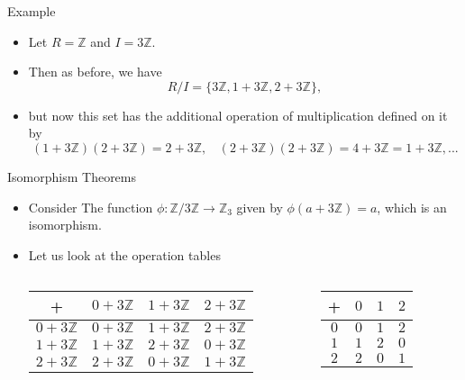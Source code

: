 \documentclass[ %
 10pt, xcolor={dvipsnames,svgnames,x11names,hyperref},
   hyperref={colorlinks=true,citecolor=green,linkcolor=DarkRed,urlcolor=ProcessBlue,anchorcolor=blue}
  ]{beamer}
\newenvironment{stepitemize}{\begin{itemize}[<+->]}{\end{itemize} }
\newcommand{\Z}{\mathbb{Z}}
\begin{document}
\begin{frame}{Example}
\begin{stepitemize}
    \item Let $R=\Z$ and $I=3\Z$.
    \item Then as before, we have
    $$R/I = \{3\Z, 1+3\Z, 2+3\Z\},$$
\item but now this set has the additional operation of multiplication defined on it by
    $$(1+3\Z)(2+3\Z)=2+3\Z, \:\:\:\: (2+3\Z)(2+3\Z) = 4+3\Z=1+3\Z, ...$$
\end{stepitemize}
\end{frame}

\begin{frame}{Isomorphism Theorems}
\begin{stepitemize}
    \item Consider The function $\phi:\Z/3\Z\rightarrow \Z_3$ given by $\phi(a+3\Z)=a$, which is an isomorphism.
    \item Let us look at the operation tables

\begin{columns}
        \begin{column}{0.4\textwidth}
     \begin{table}
\begin{tabular}{ c| c | c | c}
+ & {\color{blue}$0+3\Z$} & {\color{red} $1+3\Z$} & {\color{teal} $2+3\Z$} \\
\hline
{\color{blue} $0+3\Z$} & {\color{blue} $0+3\Z$} & {\color{red} $1+3\Z$} & {\color{teal} $2+3\Z$}  \\
\hline
{\color{red} $1+3\Z$} & {\color{red} $1+3\Z$} & {\color{teal} $2+3\Z$} & {\color{blue} $0+3\Z$}  \\
\hline
{\color{teal} $2+3\Z$} & {\color{teal} $2+3\Z$} & {\color{blue} $0+3\Z$} & {\color{red} $1+3\Z$} \\
\hline
\end{tabular}
\end{table}
    \end{column}

        \begin{column}{0.4\textwidth}
    \begin{table}
\begin{tabular}{ c| c | c | c}
+ & {\color{blue} $0$} & {\color{red} $1$} & {\color{teal} $2$} \\
\hline
{\color{blue} $0$} & {\color{blue} $0$} & {\color{red} $1$} & {\color{teal} $2$}  \\
\hline
{\color{red} $1$} & {\color{red} $1$} & {\color{teal}$2$} & {\color{blue} $0$}  \\
\hline
{\color{teal} $2$} & {\color{teal} $2$} & {\color{blue} $0$} & {\color{red} $1$} \\
\hline
\end{tabular}
\end{table}
    \end{column}
\end{columns}


\end{stepitemize}
\end{frame}
\end{document}
